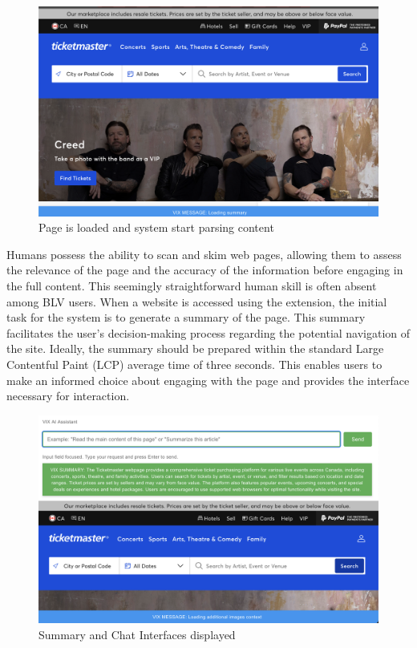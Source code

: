 \documentclass[conference]{IEEEtran}
\begin{document}
\begin{figure}[h]
\centering
\includegraphics[width=\columnwidth]{images/1.png}
\caption{Page is loaded and system start parsing content}
\label{fig:start}
\end{figure}


Humans possess the ability to scan and skim web pages, allowing them to assess the relevance of the page and the accuracy of the information before engaging in the full content. This seemingly straightforward human skill is often absent among BLV users. When a website is accessed using the extension, the initial task for the system is to generate a summary of the page. This summary facilitates the user's decision-making process regarding the potential navigation of the site. Ideally, the summary should be prepared within the standard Large Contentful Paint (LCP) average time of three seconds. This enables users to make an informed choice about engaging with the page and provides the interface necessary for interaction.

\begin{figure}[h]
\centering
\includegraphics[width=\columnwidth]{images/2.png}
\caption{Summary and Chat Interfaces displayed}
\label{fig:chat}
\end{figure}
\end{document}
